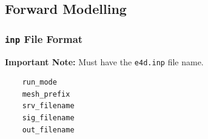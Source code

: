 \documentclass[a4paper,12pt]{article}
\begin{document}
\subsection{Forward Modelling}

\subsubsection{\texttt{inp} File Format} \label{forward_inp}

\begin{framed}
\noindent \textbf{Important Note:} Must have the \texttt{e4d.inp} file name.
\end{framed}

\begin{framed}
\begin{verbatim}
    run_mode
    mesh_prefix
    srv_filename
    sig_filename
    out_filename
\end{verbatim}
\end{framed}
\end{document}
